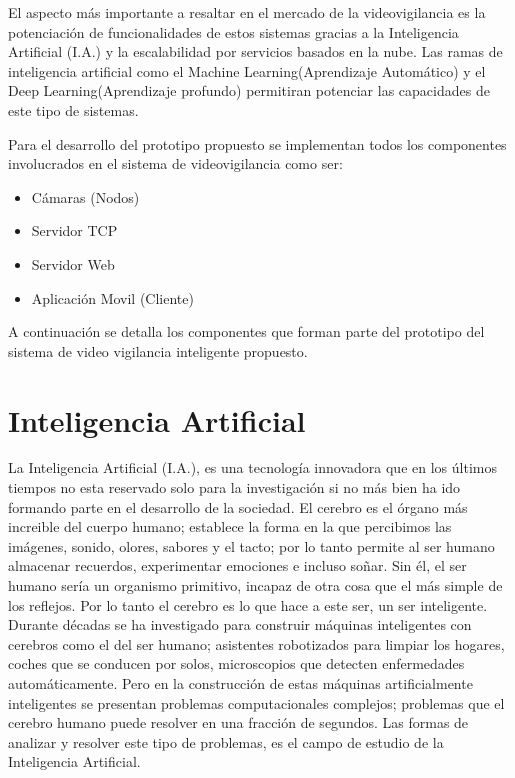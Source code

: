 El aspecto más importante a resaltar en el mercado de la videovigilancia es la potenciación de funcionalidades de estos sistemas gracias a la Inteligencia Artificial (I.A.) y la escalabilidad por servicios basados en la nube. Las ramas de inteligencia artificial como el Machine Learning(Aprendizaje Automático) y el Deep Learning(Aprendizaje profundo) permitiran potenciar las capacidades de este tipo de sistemas.

Para el desarrollo del prototipo propuesto se implementan todos los componentes involucrados en el sistema de videovigilancia como ser:
\begin{itemize}
    \item Cámaras (Nodos)
    \item Servidor TCP
    \item Servidor Web
    \item Aplicación Movil (Cliente)
\end{itemize}

A continuación se detalla los componentes que forman parte del prototipo del sistema de video vigilancia inteligente propuesto.\

\section{Inteligencia Artificial}
La Inteligencia Artificial (I.A.), es una tecnología innovadora que en los últimos tiempos no esta reservado solo para la investigación si no más bien ha ido formando parte en el desarrollo de la sociedad. El cerebro es el órgano más increible del cuerpo humano; establece la forma en la que percibimos las imágenes, sonido, olores, sabores y el tacto; por lo tanto permite al ser humano almacenar recuerdos, experimentar emociones e incluso soñar. Sin él, el ser humano sería un organismo primitivo, incapaz de otra cosa que el más simple de los reflejos. Por lo tanto el cerebro es lo que hace a este ser, un ser inteligente.\\

Durante décadas se ha investigado para construir máquinas inteligentes con cerebros como el del ser humano; asistentes robotizados para limpiar los hogares, coches que se conducen por solos, microscopios que detecten enfermedades automáticamente. Pero en la construcción de estas máquinas artificialmente inteligentes se presentan problemas computacionales complejos; problemas que el cerebro humano puede resolver en una fracción de segundos. Las formas de analizar y resolver este tipo de problemas, es el campo de estudio de la Inteligencia Artificial.

